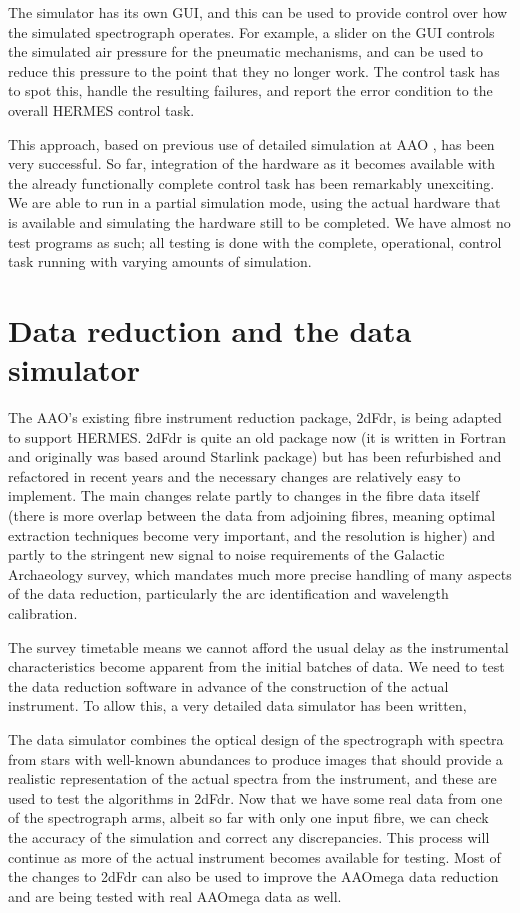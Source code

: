 \documentclass[11pt,twoside]{article}
\begin{document}
The simulator has its own GUI, and this can be used to provide control over how the simulated spectrograph operates. For example, a slider on the GUI controls the simulated air pressure for the pneumatic mechanisms, and can be used to reduce this pressure to the point that they no longer work. The control task has to spot this, handle the resulting failures, and report the error condition to the overall HERMES control task.

This approach, based on previous use of detailed simulation at AAO \citep{TCS_2010}, has been very successful. So far, integration of the hardware as it becomes available with the already functionally complete control task has been remarkably unexciting. We are able to run in a partial simulation mode, using the actual hardware that is available and simulating the hardware still to be completed. We have almost no test programs as such; all testing is done with the complete, operational, control task running with varying amounts of simulation.

\section{Data reduction and the data simulator}

The AAO's existing fibre instrument reduction package, 2dFdr, is being adapted to support HERMES. 2dFdr is quite an old package now (it is written in Fortran and originally was based around Starlink package) but has been refurbished and refactored in recent years and the necessary changes are relatively easy to implement. The main changes relate partly to changes in the fibre data itself (there is more overlap between the data from adjoining fibres, meaning optimal extraction techniques become very important, and the resolution is higher) and partly to the stringent new signal to noise requirements of the Galactic Archaeology survey, which mandates much more precise handling of many aspects of the data reduction, particularly the arc identification and wavelength calibration.

The survey timetable means we cannot afford the usual delay as the instrumental characteristics become apparent from the initial batches of data. We need to test the data reduction software in advance of the construction of the actual instrument. To allow this, a very detailed data simulator has been written,

The data simulator combines the optical design of the spectrograph with spectra from stars with well-known abundances to produce images that should provide a realistic representation of the actual spectra from the instrument, and these are used to test the algorithms in 2dFdr. Now that we have some real data from one of the spectrograph arms, albeit so far with only one input fibre, we can check the accuracy of the simulation and correct any discrepancies. This process will continue as more of the actual instrument becomes available for testing. Most of the changes to 2dFdr can also be used to improve the AAOmega data reduction and are being tested with real AAOmega data as well.
\end{document}
